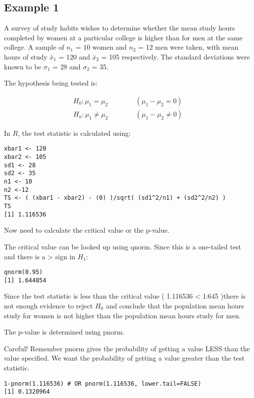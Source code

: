 \subsection{Example 1}
A survey of study habits wishes to determine whether the mean
study hours completed by women at a particular college is higher
than for men at the same college. A sample of $n_1$ = 10 women and
$n_2$ = 12 men were taken, with mean hours of study $\bar{x}_1$ =
120 and $\bar{x}_2$ = 105 respectively. The standard deviations
were known to be $\sigma_1$ = 28 and $\sigma_2$ = 35.

The hypothesis being tested is:

\begin{eqnarray}
H_{0}: \mu_1 = \mu_2\qquad \qquad (\mu_1 - \mu_2= 0)\\
H_{a}: \mu_1 \neq \mu_2 \qquad \qquad (\mu_1 - \mu_2 \neq 0)
\end{eqnarray}

In $R$, the test statistic is calculated using:

\begin{verbatim}
xbar1 <- 120
xbar2 <- 105
sd1 <- 28
sd2 <- 35
n1 <- 10
n2 <-12
TS <- ( (xbar1 - xbar2) - (0) )/sqrt( (sd1^2/n1) + (sd2^2/n2) )
TS
[1] 1.116536
\end{verbatim}
Now need to calculate the critical value or the p-value.


The critical value can be looked up using qnorm. Since this is a
one-tailed test and there is a > sign in $H_1$:

\begin{verbatim}
qnorm(0.95)
[1] 1.644854
\end{verbatim}

Since the test statistic is less than the critical value ( 1.116536 < 1:645 )there is not enough evidence to reject $H_0$
and conclude that the population mean hours study for women is
not higher than the population mean hours study for men.



The p-value is determined using pnorm.

Careful! Remember pnorm
gives the probability of getting a value LESS than the value specified. We want the probability of getting a value greater than
the test statistic.
\begin{verbatim}
1-pnorm(1.116536) # OR pnorm(1.116536, lower.tail=FALSE)
[1] 0.1320964
\end{verbatim}






